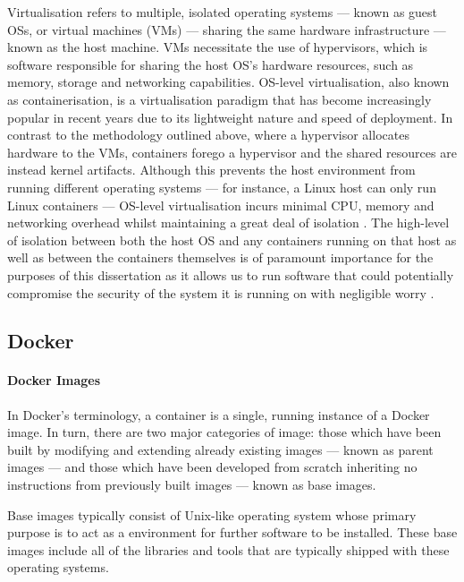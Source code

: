 \documentclass[msc,deptreport, cs]{infthesis} %
\begin{document}
Virtualisation refers to multiple, isolated operating systems --- known as guest OSs, or virtual machines (VMs) --- sharing the same hardware infrastructure --- known as the host machine. VMs necessitate the use of hypervisors, which is software responsible for sharing the host OS's hardware resources, such as memory, storage and networking capabilities.  OS-level virtualisation, also known as containerisation, is a virtualisation paradigm that has become increasingly popular in recent years due to its lightweight nature and speed of deployment. In contrast to the methodology outlined above, where a hypervisor allocates hardware to the VMs, containers forego a hypervisor and the shared resources are instead kernel artifacts. Although this prevents the host environment from running different operating systems --- for instance, a Linux host can only run Linux containers --- OS-level virtualisation incurs minimal CPU, memory and networking overhead whilst maintaining a great deal of isolation \cite{kolyshkin2006virtualization}. The high-level of isolation between both the host OS and any containers running on that host as well as between the containers themselves is of paramount importance for the purposes of this dissertation as it allows us to run software that could potentially compromise the security of the system it is running on with negligible worry \cite{reshetova2014security}.

\subsection{Docker}


\paragraph*{Docker Images}

In Docker's terminology, a container is a single, running instance of a Docker image. In turn, there are two major categories of image: those which have been built by modifying and extending already existing images --- known as parent images --- and those which have been developed from scratch inheriting no instructions from previously built images --- known as base images.

Base images typically consist of Unix-like operating system whose primary purpose is to act as a environment for further software to be installed. These base images include all of the libraries and tools that are typically shipped with these operating systems.
\end{document}
